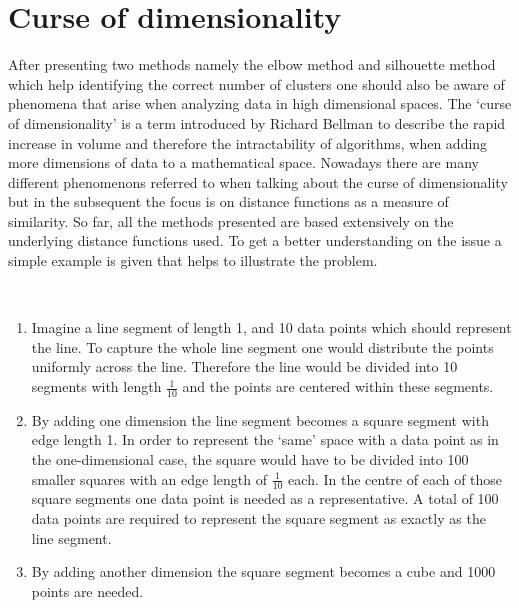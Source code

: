 \section{Curse of dimensionality}
After presenting two methods namely the elbow method and silhouette method which help identifying the correct number of clusters one should also be aware of phenomena that arise when analyzing data in high dimensional spaces. The `curse of dimensionality' is a term introduced by Richard Bellman \cite{bellman1961adaptive} to describe the rapid increase in volume and therefore the intractability of algorithms, when adding more dimensions of data to a mathematical space. Nowadays there are many different phenomenons referred to when talking about the curse of dimensionality but in the subsequent the focus is on distance functions as a measure of similarity. So far, all the methods presented are based extensively on the underlying distance functions used. To get a better understanding on the issue a simple example is given that helps to illustrate the problem.

\begin{example}\label{ex:curse_of_dimensionality}~
	\begin{enumerate}[label=(\roman*)]
		\item Imagine a line segment of length 1, and 10 data points which should represent the line. To capture the whole line segment one would distribute the points uniformly across the line. Therefore the line would be divided into 10 segments with length $\frac{1}{10}$ and the points are centered within these segments.
		\item By adding one dimension the line segment becomes a square segment with edge length 1. In order to represent the `same' space with a data point as in the one-dimensional case, the square would have to be divided into 100 smaller squares with an edge length of $\frac{1}{10}$ each. In the centre of each of those square segments one data point is needed as a representative. A total of 100 data points are required to represent the square segment as exactly as the line segment. 
		\item By adding another dimension the square segment becomes a cube and 1000 points are needed. 
	\end{enumerate}
\end{example}

